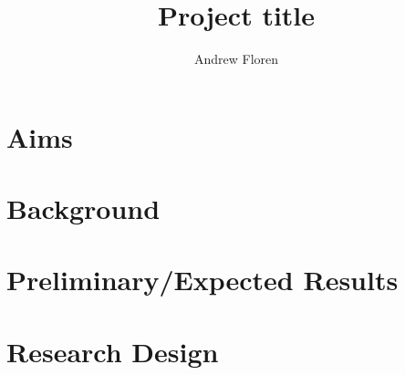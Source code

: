 \documentclass[12pt]{article}
\title{Project title}
\author{Andrew Floren}
\date{}
\begin{document}
\maketitle{}

\section{Aims}

\section{Background}

\section{Preliminary/Expected Results}

\section{Research Design}
\end{document}
